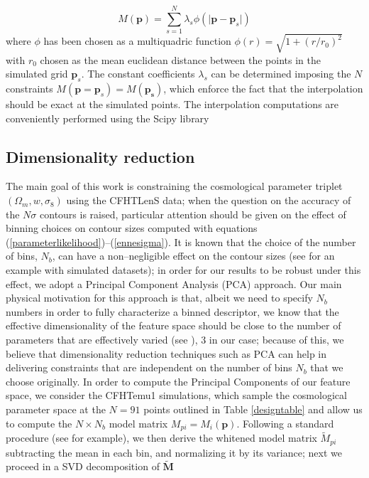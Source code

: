 \documentclass[reprint,aps,prd,superscriptaddress,showkeys,showpacs]{revtex4-1}
\begin{document}
\begin{equation}
M(\mathbf{p}) = \sum_{s=1}^N \lambda_s\phi(\vert\mathbf{p}-\mathbf{p}_s\vert)
\end{equation}
%
where $\phi$ has been chosen as a multiquadric function $\phi(r)=\sqrt{1+(r/r_0)^2}$ with $r_0$ chosen as the mean euclidean distance between the points in the simulated grid $\mathbf{p}_s$. The constant coefficients $\lambda_s$ can be determined imposing the $N$ constraints $M(\mathbf{p}=\mathbf{p}_s)=M(\mathbf{p_s})$, which enforce the fact that the interpolation should be exact at the simulated points. The interpolation computations are conveniently performed using the Scipy library \citep{scipy} 

\subsection{Dimensionality reduction}
\label{pcasection}
%
The main goal of this work is constraining the cosmological parameter triplet $(\Omega_m,w,\sigma_8)$ using the CFHTLenS data; when the question on the accuracy of the $N\sigma$ contours is raised, particular attention should be given on the effect of binning choices on contour sizes computed with equations (\ref{parameterlikelihood})--(\ref{ennesigma}). It is known that the choice of the number of bins, $N_b$, can have a non--negligible effect on the contour sizes (see \citep{Petri2013} for an example with simulated datasets); in order for our results to be robust under this effect, we adopt a Principal Component Analysis (PCA) approach. Our main physical motivation for this approach is that, albeit we need to specify $N_b$ numbers in order to fully characterize a binned descriptor, we know that the effective dimensionality of the feature space should be close to the number of parameters that are effectively varied (see \citep{coyote2}), 3 in our case; because of this, we believe that dimensionality reduction techniques such as PCA can help in delivering constraints that are independent on the number of bins $N_b$ that we choose originally. In order to compute the Principal Components of our feature space, we consider the CFHTemu1 simulations, which sample the cosmological parameter space at the $N=91$ points outlined in Table \ref{designtable} and allow us to compute the $N\times N_b$ model matrix $M_{pi}=M_i(\mathbf{p})$. Following a standard procedure (see \citep{astroMLText} for example), we then derive the whitened model matrix $\tilde{M}_{pi}$ subtracting the mean in each bin, and normalizing it by its variance; next we proceed in a SVD decomposition of $\mathbf{\tilde{M}}$
\end{document}
